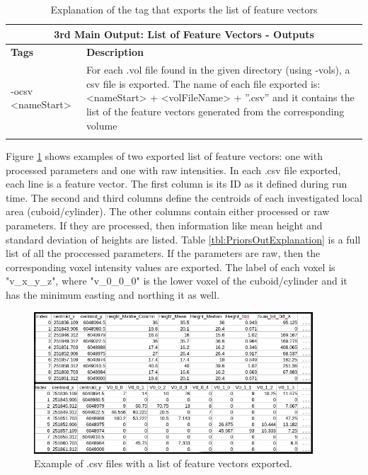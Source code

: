 \documentclass{subfiles}
\begin{document}
			\newpage
				\begin{longtable}
					{|p{3.1cm}|p{11cm}|}
					\toprule
					\multicolumn{2}{|c|}{\textbf{3rd Main Output: List of Feature Vectors  - Outputs }} \\
					\midrule
					\textbf{Tags} & \textbf{Description} \\ 
					\cmidrule(r){1-1}\cmidrule(l){2-2}
					-ocsv <nameStart> & For each .vol file found in the given directory (using -vols), a csv file is exported. The name of each file exported is:\newline <nameStart> + <volFileName> + ”.csv” \newline and it contains the list of the feature vectors generated from the corresponding volume \\
					\bottomrule
					\caption{Explanation of the tag that exports the list of feature vectors}
					\label{tbl:PriorsOutputs}	
				\end{longtable}
	     Figure \ref{fig:PriorExample} shows examples of two exported list of feature vectors: one with processed parameters and one with raw intensities. In each .csv file exported, each line is a feature vector. The first column is its ID as it defined during run time. The second and third columns define the centroids of each investigated local area (cuboid/cylinder). The other columns contain either processed or raw parameters. If they are processed, then information like mean height and standard deviation of heights are listed. Table \ref{tbl:PriorsOutExplanation} is a full list of all the proccessed parameters. If the parameters are raw, then the corresponding voxel intensity values are exported. The label of each voxel is "v\_x\_y\_z", where "v\_0\_0\_0" is the lower voxel of the cuboid/cylinder and it has the minimum easting and northing it as well. 
	     	
	
	     \begin{figure} [h!]
	     	\centering
	     	\includegraphics[width=0.93\textwidth]{tex/Appendices/img/PriorsBoth}
	     	\caption{Example of .csv files with a list of feature vectors exported. }
	     	\label{fig:PriorExample}
	     \end{figure}		
	
\end{document}
